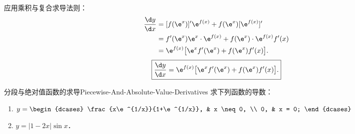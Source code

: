 \begin{solution}

    应用乘积与复合求导法则：
    \begin{equation}
        \begin{aligned}
            \frac{\d y}{\d x} & = [f(\e^x)]' \e^{f(x)} + f(\e^x) [\e^{f(x)}]'                  \\
                              & = f'(\e^x)\e^x \cdot \e^{f(x)} + f(\e^x) \cdot \e^{f(x)} f'(x) \\
                              & = \e^{f(x)} \bigl[ \e^x f'(\e^x) + f(\e^x) f'(x) \bigr].
        \end{aligned}
    \end{equation}
    \begin{equation}
        \boxed{\frac{\d y}{\d x} = \e^{f(x)} \bigl[ \e^x f'(\e^x) + f(\e^x) f'(x) \bigr].}
    \end{equation}
\end{solution}

\begin{problem}{分段与绝对值函数的求导}{Piecewise-And-Absolute-Value-Derivatives}
    求下列函数的导数：
    \begin{enumerate}
        \item $y = \begin{dcases} \frac{x\e^{1/x}}{1+\e^{1/x}}, & x \neq 0, \\ 0, & x = 0; \end{dcases}$
        \item $y = |1 - 2x|\sin x$．
    \end{enumerate}
\end{problem}

